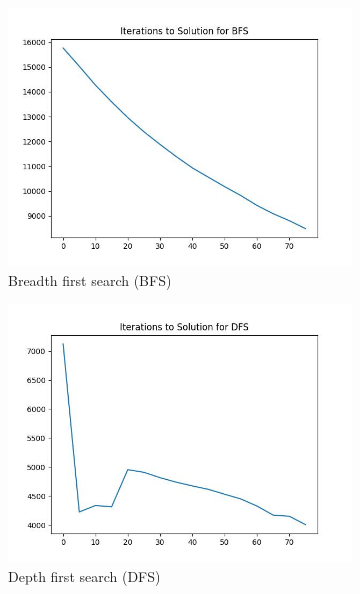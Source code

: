 \documentclass{article}
\begin{document}
\begin{figure}[H]
    \centering
    \begin{subfigure}{0.325\textwidth}
        \centering
        \includegraphics[width = \textwidth]{plots/BFS_iterations.jpg}
        \caption{Breadth first search (BFS)}
    \end{subfigure}
    \begin{subfigure}{0.325\textwidth}
        \centering
        \includegraphics[width = \textwidth]{plots/DFS_iterations.jpg}
        \caption{Depth first search (DFS)}
    \end{subfigure}
    \begin{subfigure}{0.325\textwidth}
        \centering

\end{subfigure}
\end{figure}
\end{document}
